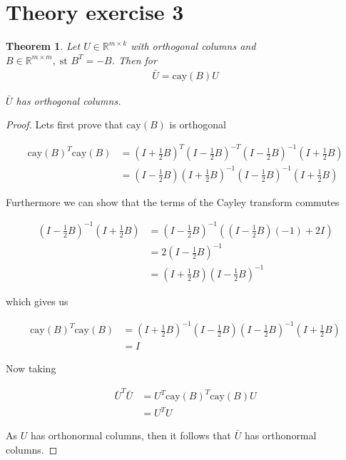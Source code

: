 \documentclass[11pt,a4paper,english]{elsarticle}%
\newtheorem{theorem}{Theorem}
\begin{document}
\section{Theory exercise 3}

\begin{theorem}
  Let $U \in \mathbb{R}^{m \times k}$ with orthogonal columns and $B \in \mathbb{R}^{m\times m}, \; \text{st } B^T = -B$. Then for
\begin{align*}
  \bar U = \text{cay}(B)U
\end{align*}

\noindent $\bar U$ has orthogonal columns.
\end{theorem}

\begin{proof}
Lets first prove that $\text{cay}(B)$ is orthogonal

  \begin{align*}
    \text{cay}(B)^T\text{cay}(B) &=  (I+\frac{1}{2}B)^T(I-\frac{1}{2}B)^{-T}(I-\frac{1}{2}B)^{-1}(I+\frac{1}{2}B)\\
    &= (I-\frac{1}{2}B)(I+\frac{1}{2}B)^{-1}(I-\frac{1}{2}B)^{-1}(I+\frac{1}{2}B)
  \end{align*}

  Furthermore we can show that the terms of the Cayley transform commutes

  \begin{align*}
    (I-\frac{1}{2}B)^{-1}(I+\frac{1}{2}B) &= (I-\frac{1}{2}B)^{-1}((I-\frac{1}{2}B)(-1) + 2I)\\
    &= 2(I-\frac{1}{2}B)^{-1} \\
    &= (I+\frac{1}{2}B)(I-\frac{1}{2}B)^{-1}
  \end{align*}

  which gives us 

  \begin{align*}
    \text{cay}(B)^T\text{cay}(B) &=  (I+\frac{1}{2}B)^{-1}(I-\frac{1}{2}B)(I-\frac{1}{2}B)^{-1}(I+\frac{1}{2}B)\\
    &= I
  \end{align*}

Now taking

\begin{align*}
  \bar U^T \bar U &= U^T\text{cay}(B)^T\text{cay}(B)U\\
  &= U^TU
\end{align*}

As $U$ has orthonormal columns, then it follows that $\bar U$ has orthonormal columns.
\end{proof}
\end{document}
